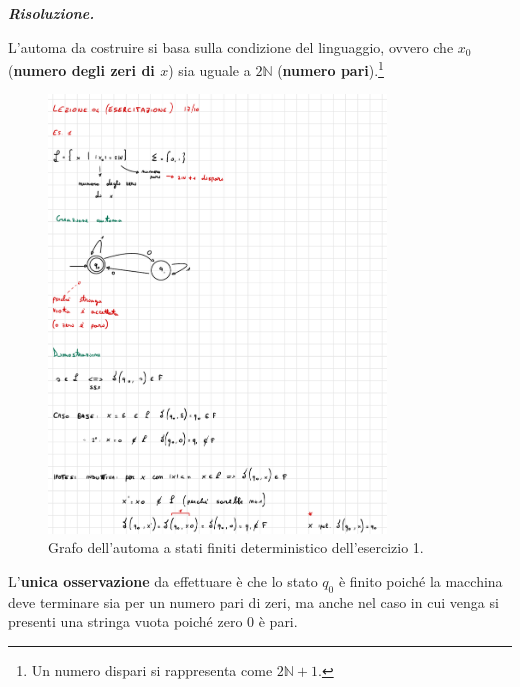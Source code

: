 \documentclass[a4paper]{article}
\begin{document}
	\noindent
	\textcolor{Green4}{\textbf{\emph{Risoluzione.}}}\newline
	
	\noindent
	L'automa da costruire si basa sulla condizione del linguaggio, ovvero che $x_{0}$ (\textbf{numero degli zeri di $x$}) sia uguale a $2\mathbb{N}$ (\textbf{numero pari}).\footnote{Un numero dispari si rappresenta come $2\mathbb{N} + 1$.}
	
	\begin{figure}[!htp]
		\centering
		\includegraphics[width=0.8\textwidth]{img/esercitazioni/01_exe1.pdf}
		\caption{Grafo dell'automa a stati finiti deterministico dell'esercizio 1.}\label{ASFD-esercizio_1}
	\end{figure}

	\noindent
	L'\textbf{unica osservazione} da effettuare è che lo stato $q_{0}$ è finito poiché la macchina deve terminare sia per un numero pari di zeri, ma anche nel caso in cui venga si presenti una stringa vuota poiché zero $0$ è pari.

	\newpage
\end{document}
